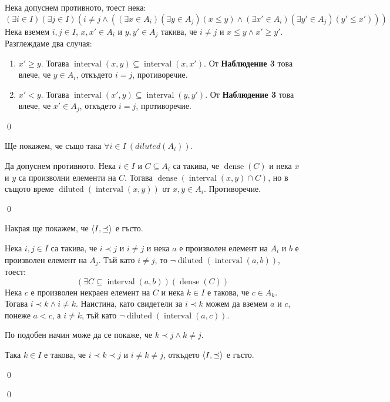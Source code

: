 \begin{problem}
\begin{tcolorbox}[mybox, title={Доказателство:}]
\quad
Нека допуснем противното, тоест нека:
\[
(\exists i \in I)(\exists j \in I)(i \neq j \land ((\exists x \in A_i)(\exists y \in A_j)(x \le y) \land (\exists x' \in A_i)(\exists y' \in A_j)(y' \le x')))
\]
\quad
Нека вземем $i, j \in I$, $x, x' \in A_i$ и $y, y' \in A_j$ такива, че $i \neq j$ и $x \le y \land x' \ge y'$. Разглеждаме два случая:
\begin{enumerate}[label={\arabic* сл.}]
\item
$x' \ge y$. Тогава $\operatorname{interval}(x, y) \subseteq \operatorname{interval}(x, x')$.
От \textbf{Наблюдение 3} това влече, че $y \in A_i$, откъдето $i = j$, противоречие.


\item
$x' < y$.
Тогава $\operatorname{interval}(x', y) \subseteq \operatorname{interval}(y, y')$.
От \textbf{Наблюдение 3} това влече, че $x' \in A_j$, откъдето $i = j$, противоречие.
\end{enumerate}

\qed
\end{tcolorbox}

\quad
Ще покажем, че също така $\forall i \in I\ (diluted(A_i))$.
\begin{tcolorbox}[mybox, title={Доказателство:}]
\quad
Да допуснем противното. Нека $i \in I$ и $C \subseteq A_i$ са такива, че $\operatorname{dense}(C)$
и нека $x$ и $y$ са произволни елементи на $C$.
Тогава $\operatorname{dense}(\operatorname{interval}(x, y) \cap C)$,
но в същото време $\operatorname{diluted}(\operatorname{interval}(x, y))$ от
$x, y \in A_i$. Противоречие.

\qed
\end{tcolorbox}
\quad
Накрая ще покажем, че $\langle I, \preceq \rangle$ е гъсто.
\begin{tcolorbox}[mybox, title={Доказателство:}]
\quad
Нека $i, j \in I$ са такива, че $i \prec j$ и $i \neq j$ и нека $a$ е произволен елемент на $A_i$ и $b$ е произволен елемент на $A_j$.
Тъй като $i \neq j$, то $\neg \operatorname{diluted}(\operatorname{interval}(a, b))$, тоест:
\[
(\exists C \subseteq \operatorname{interval}(a, b)) (\operatorname{dense}(C))
\]
\quad
Нека $c$ е произволен некраен елемент на $C$ и нека $k \in I$ е такова, че $c \in A_k$.
Тогава $i \prec k \land i \neq k$.
Наистина, като свидетели за $i \prec k$ можем да вземем $a$ и $c$, понеже $a < c$,
а $i \neq k$, тъй като $\neg \operatorname{diluted}(\operatorname{interval}(a, c))$.

\quad
По подобен начин може да се покаже, че $k \prec j \land k \neq j$.

\quad
Така $k \in I$ е такова, че $i \prec k \prec j$ и $i \neq k \neq j$, откъдето $\langle I, \preceq \rangle$ е гъсто.

\qed
\end{tcolorbox}

\qed

\end{problem}

